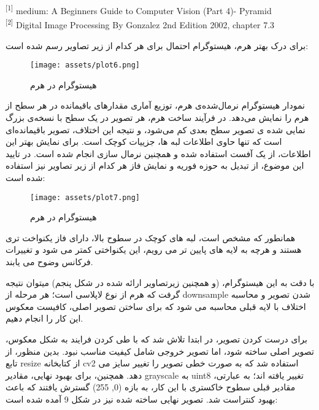 \documentclass[a4paper,12pt]{article}
\begin{document}
\vfill
\hline
\begin{LTR}
	\begin{latin}
		\begin{center}
			\begin{minipage}{0.9\linewidth}
				\small %
				\textsuperscript{[1]} medium: A Beginners Guide to Computer Vision (Part 4)- Pyramid \\
				\textsuperscript{[2]} Digital Image Processing By Gonzalez 2nd Edition 2002, chapter 7.3
			\end{minipage}
		\end{center}
	\end{latin}
\end{LTR}
 

\pagebreak

برای درک بهتر هرم، هیستوگرام احتمال برای هر کدام از زیر تصاویر رسم شده است:


\begin{figure}[h]
	\centering
	\texttt{[image: assets/plot6.png]}
	\caption{\textcolor{CustomAccent}{هیستوگرام در هرم}}
\end{figure}

نمودار هیستوگرام نرمال‌شده‌ی هرم، توزیع آماری مقدارهای باقیمانده در هر سطح از هرم را نمایش می‌دهد. در فرآیند ساخت هرم، هر تصویر در یک سطح با نسخه‌ی بزرگ‌ نمایی ‌شده ‌ی تصویر سطح بعدی کم می‌شود، و نتیجه این اختلاف، تصویر باقیمانده‌ای است که تنها حاوی اطلاعات لبه‌ ها، جزییات کوچک است. برای نمایش بهتر این اطلاعات، از یک آفست استفاده شده و همچنین نرمال سازی انجام شده است. در تایید این موضوع، از تبدیل به حوزه فوریه و نمایش فاز هر کدام از زیر تصاویر نیز استفاده شده است:

\begin{figure}[h]
	\centering
	\texttt{[image: assets/plot7.png]}
	\caption{\textcolor{CustomAccent}{هیستوگرام در هرم}}
\end{figure}
 همانطور که مشخص است، لبه های کوچک در سطوح بالا، دارای فاز یکنواخت تری هستند و هرچه به لایه های پایین تر می رویم، این یکنواختی کمتر می شود و تغییرات فرکانس وضوح می یابند.

با دقت به این هیستوگرام، (و همچنین زیرتصاویر ارائه شده در شکل پنجم) میتوان نتیجه گرفت که هرم از نوع لاپلاسی است؛ هر مرحله از downsample شدن تصویر و محاسبه اختلاف با لایه قبلی محاسبه می شود که برای ساختن تصویر اصلی، کافیست معکوس این کار را انجام دهیم.


\pagebreak

برای درست کردن تصویر، در ابتدا تلاش شد که با طی کردن فرایند به شکل معکوس، تصویر اصلی ساخته شود، اما تصویر خروجی شامل کیفیت مناسب نبود. بدین منظور، از تابع resize از کتابخانه cv2 استفاده شد که به صورت خطی تصویر را تغییر سایز می دهد. همچنین، برای بهبود نهایی، مقادیر grayscale به uint8 تغییر یافته اند؛ به عبارتی، مقادیر قبلی سطوح خاکستری با این کار، به بازه (0, 255) گسترش یافتند که باعث بهبود کنتراست شد.
تصویر نهایی ساخته شده نیز در شکل 9 آمده شده است:
\end{document}
